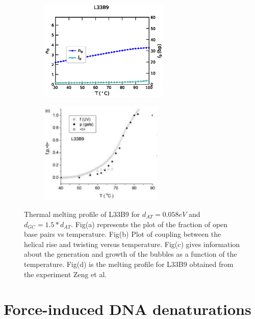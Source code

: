 \documentclass[12pt,masters,final]{UTRGVthesis}
\begin{document}
\begin{figure}[!h]
        \begin{subfigure}[b]{0.49\textwidth}
                \centering
                \includegraphics[height=1.9in, width=.8\textwidth]{L33B9_temp_bub.eps}
                \caption{}
                \label{fig:L33B9bub}
        \end{subfigure}%
        \begin{subfigure}[b]{0.49\textwidth}
                \centering
                \includegraphics[height=1.9in, width=.8\textwidth]{exp_L33B9.eps}
                \caption{}
                \label{fig:L33B9exp}
        \end{subfigure}%
       
       
\caption{Thermal melting profile of L33B9 for $d_{AT}=0.058 eV$ and $d_{GC}=1.5*d_{AT}$. Fig(a) represents the plot of the fraction of open base pairs vs temperature. Fig(b) Plot of coupling between the helical rise and twisting versus temperature. Fig(c) gives information about the generation and growth of the bubbles as a function of the temperature. Fig(d) is the melting profile for  L33B9 obtained from the experiment Zeng et al. } 
\label{fig:L33b9cal}    

\end{figure}
%
\newpage
\section{Force-induced DNA denaturations}
\end{document}
